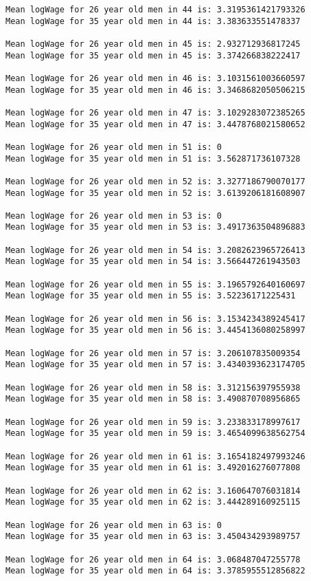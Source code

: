 \documentclass[11pt]{article}
\begin{document}
\begin{Verbatim}[commandchars=\\\{\}]
Mean logWage for 26 year old men in 44 is: 3.3195361421793326
Mean logWage for 35 year old men in 44 is: 3.383633551478337

Mean logWage for 26 year old men in 45 is: 2.932712936817245
Mean logWage for 35 year old men in 45 is: 3.374266838222417

Mean logWage for 26 year old men in 46 is: 3.1031561003660597
Mean logWage for 35 year old men in 46 is: 3.3468682050506215

Mean logWage for 26 year old men in 47 is: 3.1029283072385265
Mean logWage for 35 year old men in 47 is: 3.4478768021580652

Mean logWage for 26 year old men in 51 is: 0
Mean logWage for 35 year old men in 51 is: 3.562871736107328

Mean logWage for 26 year old men in 52 is: 3.3277186790070177
Mean logWage for 35 year old men in 52 is: 3.6139206181608907

Mean logWage for 26 year old men in 53 is: 0
Mean logWage for 35 year old men in 53 is: 3.4917363504896883

Mean logWage for 26 year old men in 54 is: 3.2082623965726413
Mean logWage for 35 year old men in 54 is: 3.566447261943503

Mean logWage for 26 year old men in 55 is: 3.1965792640160697
Mean logWage for 35 year old men in 55 is: 3.52236171225431

Mean logWage for 26 year old men in 56 is: 3.1534234389245417
Mean logWage for 35 year old men in 56 is: 3.4454136080258997

Mean logWage for 26 year old men in 57 is: 3.206107835009354
Mean logWage for 35 year old men in 57 is: 3.4340393623174705

Mean logWage for 26 year old men in 58 is: 3.312156397955938
Mean logWage for 35 year old men in 58 is: 3.490870708956865

Mean logWage for 26 year old men in 59 is: 3.233833178997617
Mean logWage for 35 year old men in 59 is: 3.4654099638562754

Mean logWage for 26 year old men in 61 is: 3.1654182497993246
Mean logWage for 35 year old men in 61 is: 3.492016276077808

Mean logWage for 26 year old men in 62 is: 3.160647076031814
Mean logWage for 35 year old men in 62 is: 3.444289160925115

Mean logWage for 26 year old men in 63 is: 0
Mean logWage for 35 year old men in 63 is: 3.450434293989757

Mean logWage for 26 year old men in 64 is: 3.068487047255778
Mean logWage for 35 year old men in 64 is: 3.3785955512856822


\end{Verbatim}
\end{document}
